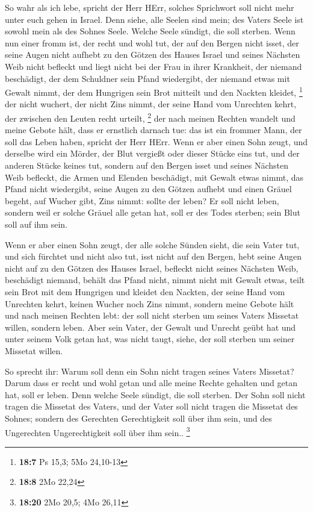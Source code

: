  So wahr als ich lebe, spricht der Herr HErr, solches
Sprichwort soll nicht mehr unter euch gehen in Israel.  Denn
siehe, alle Seelen sind mein; des Vaters Seele ist sowohl mein als des
Sohnes Seele. Welche Seele sündigt, die soll sterben.  Wenn
nun einer fromm ist, der recht und wohl tut,  der auf den
Bergen nicht isset, der seine Augen nicht aufhebt zu den Götzen des
Hauses Israel und seines Nächsten Weib nicht befleckt und liegt nicht
bei der Frau in ihrer Krankheit,  der niemand beschädigt,
der dem Schuldner sein Pfand wiedergibt, der niemand etwas mit Gewalt
nimmt, der dem Hungrigen sein Brot mitteilt und den Nackten kleidet,
\footnote{\textbf{18:7} Ps 15,3; 5Mo 24,10-13}  der nicht
wuchert, der nicht Zins nimmt, der seine Hand vom Unrechten kehrt, der
zwischen den Leuten recht urteilt, \footnote{\textbf{18:8} 2Mo 22,24}
 der nach meinen Rechten wandelt und meine Gebote hält, dass
er ernstlich darnach tue: das ist ein frommer Mann, der soll das Leben
haben, spricht der Herr HErr.  Wenn er aber einen Sohn
zeugt, und derselbe wird ein Mörder, der Blut vergießt oder dieser
Stücke eins tut,  und der anderen Stücke keines tut,
sondern auf den Bergen isset und seines Nächsten Weib befleckt,
 die Armen und Elenden beschädigt, mit Gewalt etwas nimmt,
das Pfand nicht wiedergibt, seine Augen zu den Götzen aufhebt und einen
Gräuel begeht,  auf Wucher gibt, Zins nimmt: sollte der
leben? Er soll nicht leben, sondern weil er solche Gräuel alle getan
hat, soll er des Todes sterben; sein Blut soll auf ihm sein.

 Wenn er aber einen Sohn zeugt, der alle solche Sünden
sieht, die sein Vater tut, und sich fürchtet und nicht also tut,
 isst nicht auf den Bergen, hebt seine Augen nicht auf zu
den Götzen des Hauses Israel, befleckt nicht seines Nächsten Weib,
 beschädigt niemand, behält das Pfand nicht, nimmt nicht
mit Gewalt etwas, teilt sein Brot mit dem Hungrigen und kleidet den
Nackten,  der seine Hand vom Unrechten kehrt, keinen Wucher
noch Zins nimmt, sondern meine Gebote hält und nach meinen Rechten lebt:
der soll nicht sterben um seines Vaters Missetat willen, sondern leben.
 Aber sein Vater, der Gewalt und Unrecht geübt hat und
unter seinem Volk getan hat, was nicht taugt, siehe, der soll sterben um
seiner Missetat willen.

 So sprecht ihr: Warum soll denn ein Sohn nicht tragen
seines Vaters Missetat? Darum dass er recht und wohl getan und alle
meine Rechte gehalten und getan hat, soll er leben.  Denn
welche Seele sündigt, die soll sterben. Der Sohn soll nicht tragen die
Missetat des Vaters, und der Vater soll nicht tragen die Missetat des
Sohnes; sondern des Gerechten Gerechtigkeit soll über ihm sein, und des
Ungerechten Ungerechtigkeit soll über ihm sein.. \footnote{\textbf{18:20}
  2Mo 20,5; 4Mo 26,11}

